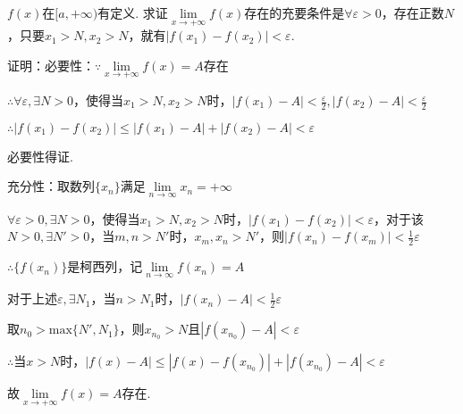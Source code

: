 \documentclass[12pt,UTF8]{ctexart}
\begin{document}
\begin{enumerate}
$f(x)$在$[a,+\infty)$有定义. 求证$\lim\limits_{x\rightarrow+\infty}f(x)$存在的充要条件是$\forall\varepsilon>0$，存在正数$N$，只要$x_1>N,x_2>N$，就有$|f(x_1)-f(x_2)|<\varepsilon$.

证明：必要性：$\because\lim\limits_{x\rightarrow+\infty}f(x)=A$存在

$\therefore\forall\varepsilon,\exists N>0$，使得当$x_1>N,x_2>N$时，$|f(x_1)-A|<\frac\varepsilon2,|f(x_2)-A|<\frac\varepsilon2$

$\therefore|f(x_1)-f(x_2)|\leq|f(x_1)-A|+|f(x_2)-A|<\varepsilon$

必要性得证.

充分性：取数列$\{x_n\}$满足$\lim\limits_{n\rightarrow\infty}x_n=+\infty$

$\forall\varepsilon>0,\exists N>0$，使得当$x_1>N,x_2>N$时，$|f(x_1)-f(x_2)|<\varepsilon$，对于该$N>0,\exists N'>0$，当$m,n>N'$时，$x_m,x_n>N'$，则$|f(x_n)-f(x_m)|<\frac12\varepsilon$

$\therefore\{f(x_n)\}$是柯西列，记$\lim\limits_{n\rightarrow\infty}f(x_n)=A$

对于上述$\varepsilon,\exists N_1$，当$n>N_1$时，$|f(x_n)-A|<\frac12\varepsilon$

取$n_0>\text{max}\{N',N_1\}$，则$x_{n_0}>N$且$|f(x_{n_0})-A|<\varepsilon$

$\therefore$当$x>N$时，$|f(x)-A|\leq|f(x)-f(x_{n_0})|+|f(x_{n_0})-A|<\varepsilon$

故$\lim\limits_{x\rightarrow+\infty}f(x)=A$存在.
\end{enumerate}
\end{document}
